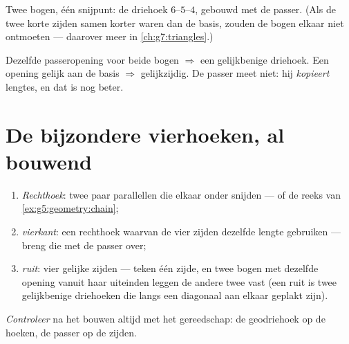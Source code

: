 \begin{omfigure}

{\small Twee bogen, één snijpunt: de driehoek $6$--$5$--$4$, gebouwd met de
passer. (Als de twee korte zijden samen korter waren dan de basis, zouden de
bogen elkaar niet ontmoeten --- daarover meer in \cref{ch:g7:triangles}.)}
\end{omfigure}

\begin{example}\label{ex:g5:geometry:special}
Dezelfde passeropening voor beide bogen $\Rightarrow$ een gelijkbenige
driehoek. Een opening gelijk aan de basis $\Rightarrow$ gelijkzijdig. De
passer meet niet: hij \emph{kopieert} lengtes, en dat is nog beter.
\end{example}

\section{De bijzondere vierhoeken, al bouwend}

\begin{method}\label{met:g5:geometry:quadrilaterals}
\begin{enumerate}
  \item \emph{Rechthoek}: twee paar parallellen die elkaar onder  snijden --- of de reeks van \cref{ex:g5:geometry:chain};
  \item \emph{vierkant}: een rechthoek waarvan de vier zijden dezelfde
        lengte gebruiken --- breng die met de passer over;
  \item \emph{ruit}: vier gelijke zijden --- teken één zijde, en twee bogen
        met dezelfde opening vanuit haar uiteinden leggen de andere twee
         vast (een ruit is twee gelijkbenige driehoeken die langs
        een diagonaal aan elkaar geplakt zijn).
\end{enumerate}
\emph{Controleer} na het bouwen altijd met het gereedschap: de geodriehoek op
de hoeken, de passer op de zijden.
\end{method}

